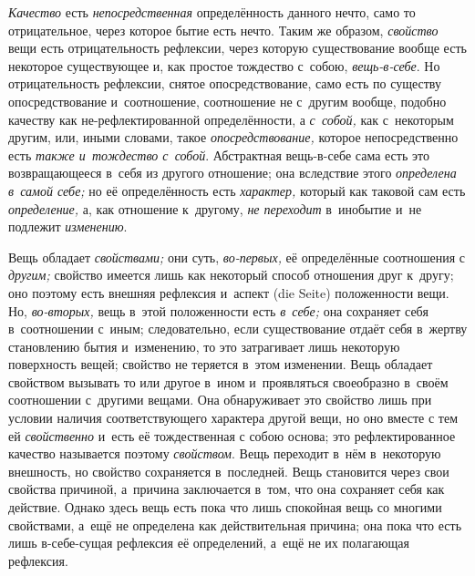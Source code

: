 {\em Качество} есть {\em непосредственная} определённость данного нечто,
само то отрицательное, через которое бытие есть нечто. Таким же образом,
{\em свойство} вещи есть отрицательность рефлексии,
через которую существование вообще есть некоторое существующее и, как
простое тождество с~собою, {\em вещь-в-себе}. Но
отрицательность рефлексии, снятое опосредствование, само есть по существу
опосредствование и~соотношение, соотношение не с~другим вообще, подобно
качеству как не-рефлектированной определённости, а
{\em с~собой,} как с~некоторым другим, или, иными
словами, такое {\em опосредствование,} которое
непосредственно есть {\em также и~тождество с~собой}.
Абстрактная вещь-в-себе сама есть это возвращающееся в~себя из другого
отношение; она вследствие этого {\em определена в~самой
себе;} но её определённость есть {\em характер,}
который как таковой сам есть {\em определение,} а, как
отношение к~другому, {\em не переходит} в~инобытие и~не
подлежит {\em изменению}.

Вещь обладает {\em свойствами;} они суть,
{\em во-первых,} её определённые соотношения с
{\em другим;} свойство имеется лишь как некоторый
способ отношения друг к~другу; оно поэтому есть внешняя рефлексия и~аспект
(die Seite) положенности вещи. Но, {\em во-вторых,}
вещь в~этой положенности есть {\em в~себе;} она
сохраняет себя в~соотношении с~иным; следовательно, если существование
отдаёт себя в~жертву становлению бытия и~изменению, то это затрагивает лишь
некоторую поверхность вещей; свойство не теряется в~этом изменении. Вещь
обладает свойством вызывать то или другое в~ином и~проявляться своеобразно
в~своём соотношении с~другими вещами. Она обнаруживает это свойство лишь
при условии наличия соответствующего характера другой вещи, но оно вместе с
тем ей {\em свойственно} и~есть её тождественная с
собою основа; это рефлектированное качество называется поэтому
{\em свойством}. Вещь переходит в~нём в~некоторую
внешность, но свойство сохраняется в~последней. Вещь становится через свои
свойства причиной, а~причина заключается в~том, что она сохраняет себя как
действие. Однако здесь вещь есть пока что лишь спокойная вещь со многими
свойствами, а~ещё не определена как действительная причина; она пока что
есть лишь в-себе-сущая рефлексия её определений, а~ещё не их полагающая
рефлексия.

